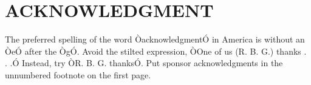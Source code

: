 \documentclass[letterpaper, 10 pt, conference]{ieeeconf}  %
\begin{document}







\section*{ACKNOWLEDGMENT}

The preferred spelling of the word ÒacknowledgmentÓ in America is without an ÒeÓ after the ÒgÓ. Avoid the stilted expression, ÒOne of us (R. B. G.) thanks . . .Ó  Instead, try ÒR. B. G. thanksÓ. Put sponsor acknowledgments in the unnumbered footnote on the first page.






\end{document}
